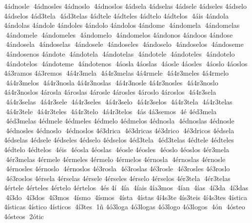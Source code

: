 4ádnosle  4ádnosles  
4ádnoslo  4ádnoslos  	4ádsela  
4ádselas  	4ádsele  
4ádseles  	4ádselo  
4ádselos  
4ád3tela  4ád3telas  	4ádtele  
4ádteles  	4ádtelo  
4ádtelos  4áis  	4ándola  
4ándolas  	4ándole  
4ándoles  	4ándolo  
4ándolos  	4ándome  4ándomela  4ándomelas  4ándomele  4ándomeles  4ándomelo  4ándomelos  
4ándonos  	4ándoos  	4ándose  4ándosela  4ándoselas  4ándosele  4ándoseles  4ándoselo  4ándoselos  4ándoseme  4ándosenos  	4ándote  4ándotela  4ándotelas  4ándotele  4ándoteles  4ándotelo  4ándotelos  4ándoteme  4ándotenos  4áosla  	4áoslas  4áosle  	4áosles  4áoslo  	4áoslos  
4á3ramos  
4á3remos  4á4r3mela  4á4r3melas  
4á4rmele  4á4r3meles  
4á4rmelo  4á4r3melos  4á4r3nosla  
4á4r3noslas  4á4r3nosle  
4á4r3nosles  4á4r3noslo  
4á4r3noslos  	4árosla  
4ároslas  	4árosle  
4árosles  	4ároslo  
4ároslos  4á4r3sela  4á4r3selas  4á4r3sele  4á4r3seles  4á4r3selo  4á4r3selos  4á4r3tela  4á4r3telas  4á4r3tele  4á4r3teles  4á4r3telo  4á4r3telos  4ás  
4á3semos  4é  
4éd3mela  4éd3melas  	4édmele  
4édmeles  	4édmelo  
4édmelos  
4édnosla  4édnoslas  
4édnosle  4édnosles  
4édnoslo  4édnoslos  
4é3drica  4é3dricas  
4é3drico  4é3dricos  	4édsela  
4édselas  	4édsele  
4édseles  	4édselo  
4édselos  
4éd3tela  4éd3telas  	4édtele  
4édteles  	4édtelo  
4édtelos  4éis  4éosla  	4éoslas  4éosle  	4éosles  4éoslo  	4éoslos  
4ér3mela  4ér3melas  	4érmele  
4érmeles  	4érmelo  
4érmelos  
4érnosla  4érnoslas  
4érnosle  4érnosles  
4érnoslo  4érnoslos  
4é3rosla  4é3roslas  
4é3rosle  4é3rosles  
4é3roslo  4é3roslos  	4érsela  
4érselas  	4érsele  
4érseles  	4érselo  
4érselos  
4ér3tela  4ér3telas  	4értele  
4érteles  	4értelo  
4értelos  4és 4í  4ía  4íais  	4ía3mos  4ían  4ías  4í3da  4í3das  4í3do  4í3dos  4í3mos  4ísmo  4ísmos  4ísta  4ístas  	4í4s3te  
4ís3teis  
4í4s3tes  	4ística  
4ísticas  	4ístico  
4ísticos  4í3tes  1ñ 	4ó3loga  
4ó3logas  	4ó3logo  
4ó3logos  4ón  4ósteo  	4ósteos  2ótic